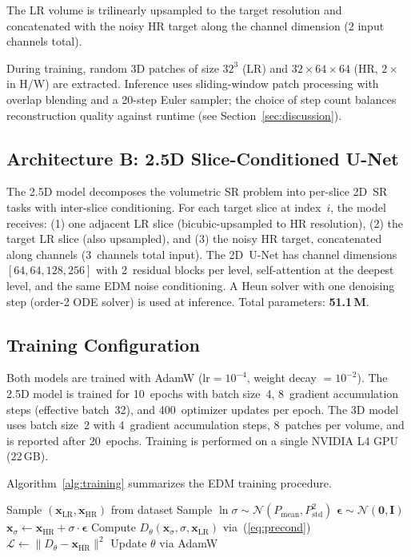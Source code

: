 \documentclass[10pt,journal]{IEEEtran}
\begin{document}
The LR volume is trilinearly upsampled to the target resolution and
concatenated with the noisy HR target along the channel dimension (2
input channels total).

During training, random 3D patches of size $32^3$ (LR) and
$32 \times 64 \times 64$ (HR, $2\times$ in H/W) are extracted.
Inference uses sliding-window patch processing with overlap blending
and a 20-step Euler sampler; the choice of step count balances
reconstruction quality against runtime (see Section~\ref{sec:discussion}).

\subsection{Architecture B: 2.5D Slice-Conditioned U-Net}

The 2.5D model decomposes the volumetric SR problem into per-slice
2D~SR tasks with inter-slice conditioning.  For each target slice at
index~$i$, the model receives: (1) one adjacent LR slice
(bicubic-upsampled to HR resolution), (2) the target LR slice (also
upsampled), and (3) the noisy HR target, concatenated along channels
(3~channels total input).  The 2D~U-Net has channel dimensions
$[64, 64, 128, 256]$ with 2~residual blocks per level,
self-attention at the deepest level, and the same EDM noise
conditioning.  A Heun solver with one denoising step (order-2 ODE solver) is used
at inference.  Total parameters: \textbf{51.1\,M}.

\subsection{Training Configuration}

Both models are trained with AdamW ($\text{lr} = 10^{-4}$,
weight decay $= 10^{-2}$).  The 2.5D model is trained for 10~epochs
with batch size~4, 8~gradient accumulation steps (effective batch~32),
and 400~optimizer updates per epoch.  The 3D model uses batch size~2
with 4~gradient accumulation steps, 8~patches per volume, and is
reported after 20~epochs.  Training is performed on a single NVIDIA L4
GPU (22\,GB).

Algorithm~\ref{alg:training} summarizes the EDM training procedure.

\begin{algorithm}[!t]
\caption{EDM-based MRI Super-Resolution Training}
\label{alg:training}
\begin{algorithmic}[1]
\REPEAT
  \STATE Sample $(\mathbf{x}_\text{LR}, \mathbf{x}_\text{HR})$
         from dataset
  \STATE Sample $\ln\sigma \sim \mathcal{N}(P_\text{mean}, P_\text{std}^2)$
  \STATE $\boldsymbol{\epsilon} \sim \mathcal{N}(\mathbf{0}, \mathbf{I})$
  \STATE $\mathbf{x}_\sigma \leftarrow
         \mathbf{x}_\text{HR} + \sigma \cdot \boldsymbol{\epsilon}$
  \STATE Compute $D_\theta(\mathbf{x}_\sigma, \sigma, \mathbf{x}_\text{LR})$
         via~(\ref{eq:precond})
  \STATE $\mathcal{L} \leftarrow
         \|D_\theta - \mathbf{x}_\text{HR}\|^2$
  \STATE Update $\theta$ via AdamW
\end{algorithmic}
\end{algorithm}
\end{document}
